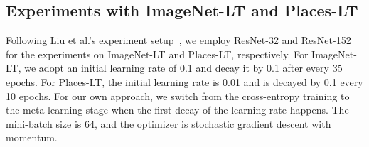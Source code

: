 \begin{table}
\centering

\caption {\label{tab:largescale-LT} Classification errors on ImageNet-LT and Places-LT. (*reported in paper. CE=cross-entropy, CB=class-balanced)}
\vspace{2pt}
\vspace{-5pt}
\end{table}




\subsection{Experiments with ImageNet-LT and Places-LT}
Following Liu et al.'s experiment setup~\cite{OLTR}, we employ ResNet-32 and ResNet-152 for the experiments on ImageNet-LT and Places-LT, respectively. For ImageNet-LT, we adopt an initial learning rate of 0.1 and decay it by 0.1 after every 35 epochs. For Places-LT, the initial learning rate is 0.01 and is decayed by 0.1 every 10 epochs. For our own approach, we switch from the cross-entropy training to the meta-learning stage when the first decay of the learning rate happens. The mini-batch size is 64, and the optimizer is stochastic gradient descent with momentum. 

\vspace{-10pt}
